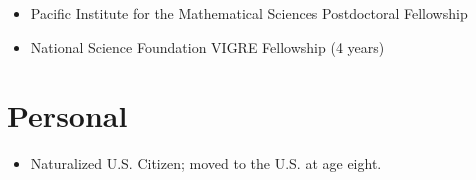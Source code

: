 \documentclass[margin]{res}
\def\tightlist{}
\begin{document}
\begin{resume}
\begin{itemize}
\tightlist
\item
  Pacific Institute for the Mathematical Sciences Postdoctoral
  Fellowship
\item
  National Science Foundation VIGRE Fellowship (4 years)
\end{itemize}

\hypertarget{personal}{%
\section{Personal}\label{personal}}

\begin{itemize}
\tightlist
\item
  Naturalized U.S. Citizen; moved to the U.S. at age eight.
\end{itemize}

\end{resume}
\end{document}
